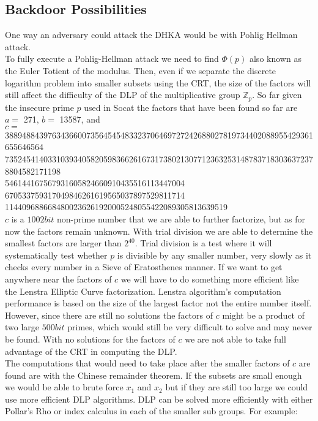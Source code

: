 \documentclass[letterpaper,11pt,notitlepage,fleqn]{article}
\begin{document}
\subsection{Backdoor Possibilities}
\noindent One way an adversary could attack the DHKA would be with Pohlig Hellman attack.\\
\indent To fully execute a Pohlig-Hellman attack we need to find $\Phi(p)$ also known as the Euler Totient of the modulus. Then, even if we separate the discrete logarithm problem into smaller subsets using the CRT, the size of the factors will still affect the difficulty of the DLP of the multiplicative group $\mathbb{Z}_{p}$. So far given the insecure prime $p$ used in Socat the factors that have been found so far are $a =$ 271, $b =$ 13587, and 
\\$c =$
388948843976343660073564545483323706469727242688027819734402088955429361655646564 \\
7352454140331039340582059836626167317380213077123632531487837183036372378804582171198 \\
546144167567931605824660910435516113447004 670533759317049846261619565037897529811714 \\
1144096886684800236261920005248055422089305813639519 \\ 
$c$ is a $1002 bit$ non-prime number that we are able to further factorize, but as for now the factors remain unknown. With trial division we are able to determine the smallest factors are larger than $2^{40}$. Trial division is a test where it will systematically test whether $p$ is divisible by any smaller number, very slowly as it checks every number in a Sieve of Eratosthenes manner. If we want to get anywhere near the factors of $c$ we will have to do something more efficient
like the Lenstra Elliptic Curve factorization. Lenstra algorithm's computation performance is based on the size of the largest factor not the entire number itself.  However, since there are still no solutions the factors of $c$ might be a product of two large $500 bit$ primes, which would still be very difficult to solve and may never be found. With no solutions for the factors of $c$ we are not able to take full advantage of the CRT in computing the DLP. 
\\
\indent The computations that would need to take place after the smaller factors of $c$ are found are with the Chinese remainder theorem. If the subsets are small enough we would be able to brute force $x_{1}$ and $x_{2}$ but if they are still too large we could use more efficient DLP algorithms. DLP can be solved more efficiently with either Pollar's Rho or index calculus in each of the smaller sub groups. For example:\\
\end{document}
